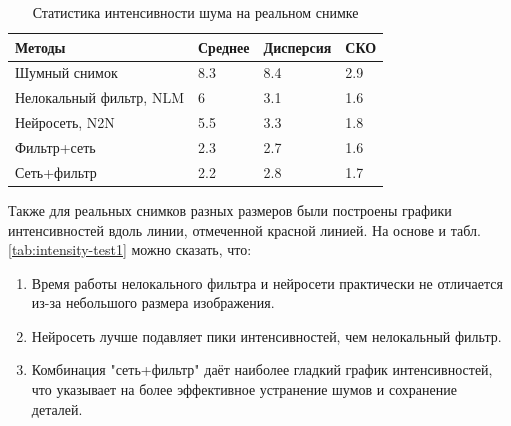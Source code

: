 \begin{table} [H]%
	\centering\small
	\caption{Статистика интенсивности шума на реальном снимке}%
	\label{tab:real-segment}		
	\begin{tabular}{|l|l|l|l|}
		\hline
		Методы&Среднее&Дисперсия&СКО\\
		\hline	
		Шумный снимок
		&8.3&8.4&2.9\\ \hline
		Нелокальный фильтр, NLM
		&6&3.1&1.6\\ \hline
		Нейросеть, N2N&5.5&3.3&1.8\\ \hline
		Фильтр+сеть
		&2.3&2.7&1.6\\ \hline Сеть+фильтр
		&2.2&2.8&1.7\\ \hline			
	\end{tabular}
	\normalsize%
\end{table}
\par Также для реальных снимков разных размеров были построены графики интенсивностей вдоль линии, отмеченной красной линией. На основе  и табл. \ref{tab:intensity-test1} можно сказать, что:
\begin{enumerate}[]
	\item Время работы нелокального фильтра и нейросети практически не отличается из-за небольшого размера изображения.
	\item Нейросеть лучше подавляет пики интенсивностей, чем нелокальный фильтр.
	\item Комбинация "сеть+фильтр" даёт наиболее гладкий график интенсивностей, что указывает на более эффективное устранение шумов и сохранение деталей.
\end{enumerate}
